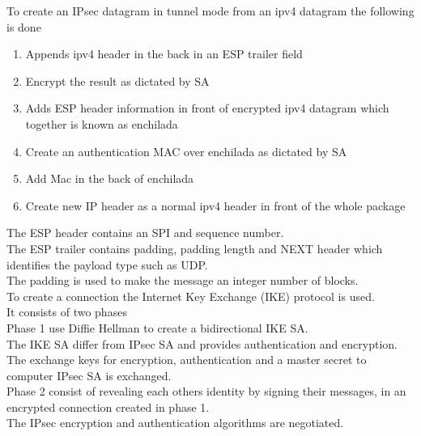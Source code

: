 \documentclass[12pt, a4paper]{article}
\begin{document}
		To create an IPsec datagram in tunnel mode from an ipv4 datagram the following is done
		\begin{enumerate}
			\item Appends ipv4 header in the back in an ESP trailer field
			\item Encrypt the result as dictated by SA
			\item Adds ESP header information in front of encrypted ipv4 datagram which together is known as enchilada
			\item Create an authentication MAC over enchilada as dictated by SA
			\item Add Mac in the back of enchilada
			\item Create new IP header as a normal ipv4 header in front of the whole package
		\end{enumerate}
		The ESP header contains an SPI and sequence number.\\
		The ESP trailer contains padding, padding length and NEXT header which identifies the payload type such as UDP.\\
		The padding is used to make the message an integer number of blocks.\\
		To create a connection the Internet Key Exchange (IKE) protocol is used.\\
		It consists of two phases\\
		Phase 1 use Diffie Hellman to create a bidirectional IKE SA.\\
		The IKE SA differ from IPsec SA and provides authentication and encryption.\\
		The exchange keys for encryption, authentication and a master secret to computer IPsec SA is exchanged.\\
		Phase 2 consist of revealing each others identity by signing their messages, in an encrypted connection created in phase 1.\\
		The IPsec encryption and authentication algorithms are negotiated.
\end{document}
